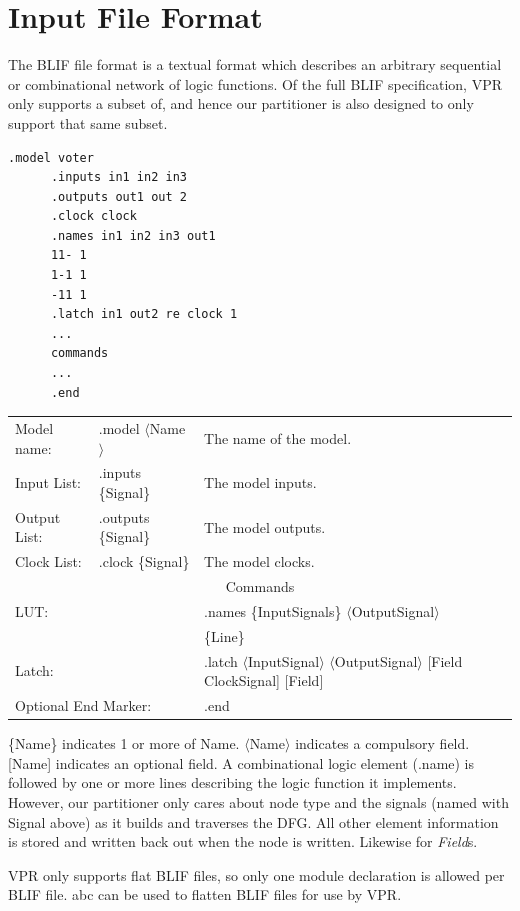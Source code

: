 \documentclass[12pt,final,oneside]{dwThesis} %
\begin{document}
   \section{Input File Format}\label{secBlif}
   The \ac{BLIF} file format is a textual format which describes an arbitrary sequential or combinational network of logic functions\cite{BLIF}.
   Of the full \ac{BLIF} specification, \ac{VPR} only supports a subset of, and hence our partitioner is also designed to only support that same subset.
   \begin{lstlisting}[caption=BLIF file layout, label=SampleBlif]
      .model voter
      .inputs in1 in2 in3
      .outputs out1 out 2
      .clock clock
      .names in1 in2 in3 out1
      11- 1
      1-1 1
      -11 1
      .latch in1 out2 re clock 1
      ...
      commands
      ...
      .end
   \end{lstlisting}


   \begin{tabular}{lll}
      Model name: & .model $\langle$Name$\rangle$ & The name of the model.\\
      Input List: & .inputs \{Signal\} & The model inputs.\\
      Output List:& .outputs \{Signal\} & The model outputs.\\
      Clock List: & .clock \{Signal\} & The model clocks.\\
      \multicolumn{3}{c}{Commands}\\
      \multicolumn{2}{l}{\ac{LUT}:} & .names \{InputSignals\} $\langle$OutputSignal$\rangle$\\
      &&\{Line\}\\
      \multicolumn{2}{l}{Latch:} & .latch $\langle$InputSignal$\rangle$ $\langle$OutputSignal$\rangle$ [Field ClockSignal] [Field]\\
      \multicolumn{2}{l}{Optional End Marker:} & .end
   \end{tabular}

   \{Name\} indicates 1 or more of Name. $\langle$Name$\rangle$ indicates a compulsory field. [Name] indicates an optional field.
   A combinational logic element (.name) is followed by one or more lines describing the logic function it implements. However, our partitioner only cares about node type and the signals (named with Signal above) as it builds and traverses the \ac{DFG}. All other element information is stored and written back out when the node is written. Likewise for \textit{Field}s.

   \ac{VPR} only supports flat \ac{BLIF} files, so only one module declaration is allowed per \ac{BLIF} file. \ac{abc} can be used to flatten \ac{BLIF} files for use by \ac{VPR}.
\end{document}
